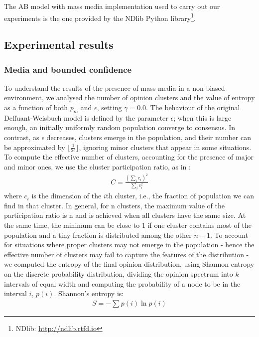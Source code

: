 \documentclass[10pt,letterpaper]{article}
\begin{document}
The AB model with mass media implementation used to carry out our experiments is the one provided by the NDlib \cite{rossetti2018ndlib} Python library\footnote{NDlib: \url{http://ndlib.rtfd.io}}.


\subsection{Experimental results}
\subsubsection{Media and bounded confidence}
To understand the results of the presence of mass media in a non-biased environment, we analysed the number of opinion clusters and the value of entropy as a function of both $p_{m}$ and $\epsilon$, setting $\gamma=0.0$. 
The behaviour of the original Deffuant-Weisbuch model is defined by the parameter $\epsilon$; when this is large enough, an initially uniformly random population converge to consensus. In contrast, as $\epsilon$ decreases, clusters emerge in the population, and their number can be approximated by $\lfloor{\frac{1}{2\epsilon}\rfloor}$, ignoring minor clusters that appear in some situations. 
To compute the effective number of clusters, accounting for the presence of major and minor ones, we use the cluster participation ratio, as in \cite{Srbu2019AlgorithmicBA}:
\begin{eqnarray}
    \label{eq:ncluster}
    C = \frac{(\sum_{i}{c_{i}})^{2}}{\sum_{i}{c_{i}^{2}}}
\end{eqnarray}
where $c_{i}$ is the dimension of the $i$th cluster, i.e., the fraction of population we can find in that cluster. In general, for n clusters, the maximum value of the participation ratio is n and is achieved when all clusters have the same size. At the same time, the minimum can be close to 1 if one cluster contains most of the population and a tiny fraction is distributed among the other $n − 1$.
To account for situations where proper clusters may not emerge in the population - hence the effective number of clusters may fail to capture the features of the distribution - we computed the entropy of the final opinion distribution, using Shannon entropy on the discrete probability distribution, dividing the opinion spectrum into $k$ intervals of equal width and computing the probability of a node to be in the interval $i$, $p(i)$. Shannon's entropy is:
\begin{eqnarray}
    \label{eq:entropy}
    S = {-\sum{p(i)\ln p(i)}}
\end{eqnarray}
\end{document}
